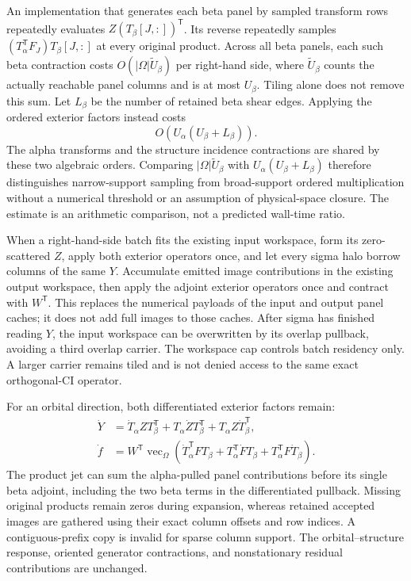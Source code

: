 \documentclass[11pt,a4paper]{article}
\newcommand{\Tr}{^{\mathsf T}}
\begin{document}
An implementation that generates each beta panel by sampled transform rows
repeatedly evaluates $Z(T_\beta[J,:])\Tr$. Its reverse repeatedly samples
$(T_\alpha\Tr F_J)T_\beta[J,:]$ at every original product. Across all beta
panels, each such beta contraction costs
$O(|\Omega|\widetilde U_\beta)$ per right-hand side, where
$\widetilde U_\beta$ counts the actually reachable panel columns and is at
most $U_\beta$. Tiling alone does not remove this
sum. Let $L_\beta$ be the number of retained beta shear edges. Applying the
ordered exterior factors instead costs
\begin{equation}\label{eq:ordered-beta-cost}
 O\!\left(U_\alpha(U_\beta+L_\beta)\right).
\end{equation}
The alpha transforms and the structure incidence contractions are shared
by these two algebraic orders. Comparing
$|\Omega|\widetilde U_\beta$ with $U_\alpha(U_\beta+L_\beta)$ therefore distinguishes
narrow-support sampling from broad-support ordered multiplication without
a numerical threshold or an assumption of physical-space closure.
The estimate is an arithmetic comparison, not a predicted wall-time ratio.

When a right-hand-side batch fits the existing input workspace, form its
zero-scattered $Z$, apply both exterior operators once, and let every sigma
halo borrow columns of the same $Y$. Accumulate emitted image contributions
in the existing output workspace, then apply the adjoint exterior operators
once and contract with $W\Tr$. This replaces the numerical payloads of the
input and output panel caches; it does not add full images to those caches.
After sigma has finished reading $Y$, the input workspace can be overwritten
by its overlap pullback, avoiding a third overlap carrier. The workspace
cap controls batch residency only. A larger carrier remains tiled and is
not denied access to the same exact orthogonal-CI operator.

For an orbital direction, both differentiated exterior factors remain:
\begin{align}
 \dot Y&=\dot T_\alpha ZT_\beta\Tr+
          T_\alpha\dot ZT_\beta\Tr+
          T_\alpha Z\dot T_\beta\Tr,\\
 \dot f&=W\Tr\operatorname{vec}_{\Omega}\!\left(
       \dot T_\alpha\Tr F T_\beta+
       T_\alpha\Tr\dot F T_\beta+
       T_\alpha\Tr F\dot T_\beta\right).
\end{align}
The product jet can sum the alpha-pulled panel contributions before its
single beta adjoint, including the two beta terms in the differentiated
pullback. Missing original products remain zeros during expansion, whereas
retained accepted images are gathered using their exact column offsets and
row indices. A contiguous-prefix copy is invalid for sparse column support.
The orbital--structure response, oriented generator contractions, and
nonstationary residual contributions are unchanged.
\end{document}
